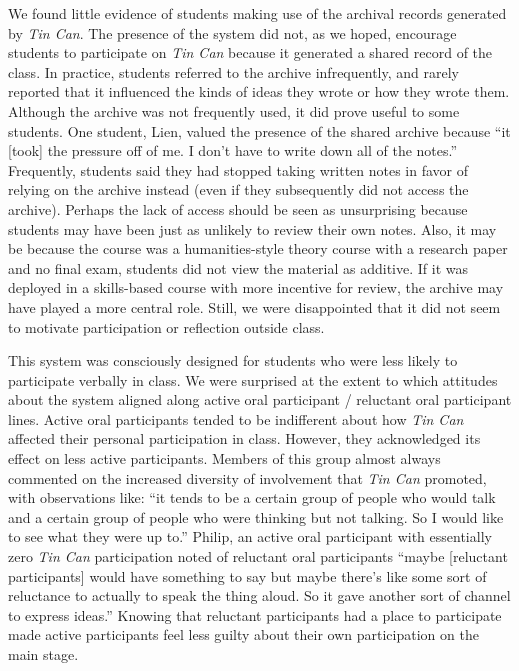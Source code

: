 We found little evidence of students making use of the archival records generated by \emph{Tin Can}. The presence of the system did not, as we hoped, encourage students to participate on \emph{Tin Can} because it generated a shared record of the class. In practice, students referred to the archive infrequently, and rarely reported that it influenced the kinds of ideas they wrote or how they wrote them. Although the archive was not frequently used, it did prove useful to some students. One student, Lien, valued the presence of the shared archive because ``it [took] the pressure off of me. I don't have to write down all of the notes.'' Frequently, students said they had stopped taking written notes in favor of relying on the archive instead (even if they subsequently did not access the archive). Perhaps the lack of access should be seen as unsurprising because students may have been just as unlikely to review their own notes. Also, it may be because the course was a humanities-style theory course with a research paper and no final exam, students did not view the material as additive.  If it was deployed in a skills-based course with more incentive for review, the archive may have played a more central role. Still, we were disappointed that it did not seem to motivate participation or reflection outside class. 


This system was consciously designed for students who were less likely to participate verbally in class. We were surprised at the extent to which attitudes about the system aligned along active oral participant / reluctant oral participant lines. Active oral participants tended to be indifferent about how \emph{Tin Can} affected their personal participation in class. However, they acknowledged its effect on less active participants.  Members of this group almost always commented on the increased diversity of involvement that \emph{Tin Can} promoted, with observations like: ``it tends to be a certain group of people who would talk and a certain group of people who were thinking but not talking. So I would like to see what they were up to.'' Philip, an active oral participant with essentially zero \emph{Tin Can} participation noted of reluctant oral participants ``maybe [reluctant participants] would have something to say but maybe there's like some sort of reluctance to actually to speak the thing aloud. So it gave another sort of channel to express ideas.'' Knowing that reluctant participants had a place to participate made active participants feel less guilty about their own participation on the main stage.

